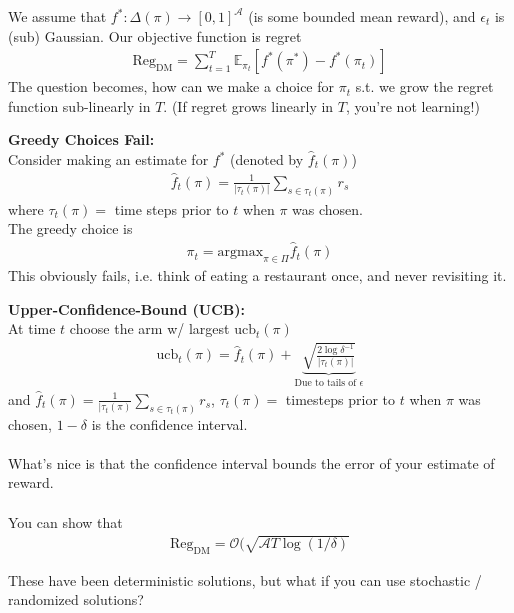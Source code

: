 We assume that $f^* : \Delta(\pi) \to  [0,1]^{\mathcal A}$ (is some bounded mean reward), and $\epsilon_t$ is (sub) Gaussian. Our objective function is regret
\begin{align}
	\text{Reg}_{\text{DM}} = \sum_{t=1}^T \mathbb E_{\pi_t} [f^*(\pi^*) - f^*(\pi_t)]
\end{align}
The question becomes, how can we make a choice for $\pi_t$ s.t. we grow the regret function sub-linearly in $T$. (If regret grows linearly in $T$, you're not learning!)
\begin{sidework}
\textbf{Greedy Choices Fail:}\\
Consider making an estimate for $f^*$ (denoted by $\hat f_t(\pi)$)
\begin{align}
	\hat f_t(\pi) = \frac{1}{|\tau_t(\pi)|} \sum_{s \in \tau_t(\pi)} r_s
\end{align}
where $\tau_t(\pi)=$ time steps prior to $t$ when $\pi$ was chosen. \\The greedy choice is
\begin{align}
	\pi_t = \text{argmax}_{\pi \in \Pi} \hat f_t(\pi)
\end{align}
This obviously fails, i.e. think of eating a restaurant once, and never revisiting it.
\end{sidework}
\begin{sidework}
	\textbf{Upper-Confidence-Bound (UCB):}\\
	At time $t$ choose the arm w/ largest $\text{ucb}_t(\pi)$
	\begin{align}
		\text{ucb}_t(\pi) = \hat f_t (\pi) + \underbrace{\sqrt{\frac{2\log \delta^{-1}}{|\tau_t(\pi)|}}}_{\text{Due to tails of } \epsilon}
	\end{align}
	and $\hat f_t(\pi) = \frac{1}{|\tau_t(\pi)} \sum_{s \in \tau_t(\pi)} r_s$, $\tau_t(\pi) = $ timesteps prior to $t$ when $\pi$ was chosen, $1-\delta$ is the confidence interval.\\
	\\
	What's nice is that the confidence interval bounds the error of your estimate of reward.\\
	\\
	You can show that 
	\begin{align}
		\text{Reg}_{\text{DM}} = \mathcal O(\sqrt{\mathcal A T \log (1/\delta)}
	\end{align}
\end{sidework}
These have been deterministic solutions, but what if you can use stochastic / randomized solutions?
